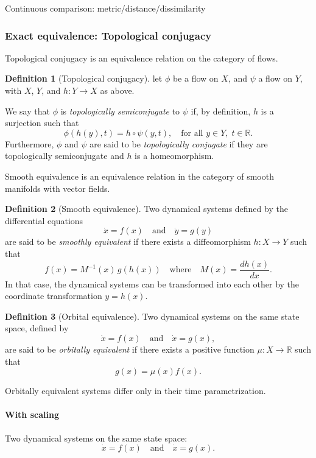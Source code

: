 \documentclass{article}
\theoremstyle{definition} \newtheorem{definition}{Definition}  \newtheorem{example}{Example}
\theoremstyle{remark} \newtheorem{remark}{Remark}
\newcounter{ct}
\begin{document}
Continuous comparison: metric/distance/dissimilarity



\subsubsection{Exact equivalence: Topological conjugacy}\label{sec:top_conj}

Topological conjugacy is an equivalence relation on the category of flows. %
\begin{definition}[Topological conjugacy]\label{def:top_conj}
let $\phi$ be a flow on $X$, and $\psi$ a flow on $Y$, with $X$, $Y$, and $h\colon Y \to X$ as above.

We say that $\phi$ is \emph{topologically semiconjugate} to $\psi$ if, by definition, $h$ is a surjection such that
\[
\phi(h(y), t) = h \circ \psi(y, t), \quad \text{for all } y \in Y, \; t \in \mathbb{R}.
\]
Furthermore, $\phi$ and $\psi$ are said to be \emph{topologically conjugate} if they are topologically semiconjugate and $h$ is a homeomorphism.
\end{definition}

Smooth equivalence is an equivalence relation in the category of smooth manifolds with vector fields. %
\begin{definition}[Smooth equivalence]\label{def:smooth_equivalence}
Two dynamical systems defined by the differential equations 
\[
\dot{x} = f(x) \quad \text{and} \quad \dot{y} = g(y)
\]
are said to be \emph{smoothly equivalent} if there exists a diffeomorphism \( h \colon X \to Y \) such that
\[
f(x) = M^{-1}(x) \, g(h(x)) \quad \text{where} \quad M(x) = \frac{d h(x)}{d x}.
\]
In that case, the dynamical systems can be transformed into each other by the coordinate transformation \( y = h(x) \).
\end{definition}

\begin{definition}[Orbital equivalence]
Two dynamical systems on the same state space, defined by 
\[
\dot{x} = f(x) \quad \text{and} \quad \dot{x} = g(x),
\]
are said to be \emph{orbitally equivalent} if there exists a positive function \( \mu \colon X \to \mathbb{R} \) such that
\[
g(x) = \mu(x) f(x).
\]
\end{definition}
Orbitally equivalent systems differ only in their time parametrization.


\paragraph{With scaling}
Two dynamical systems on the same state space:
\[
\dot{x} = f(x) \quad \text{and} \quad \dot{x} = g(x).
\]
\end{document}

